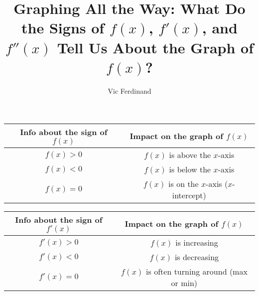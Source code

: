 \documentclass{ximera}
\author{Vic Ferdinand}
\title{Graphing All the Way: What Do the Signs of $f(x)$, $f'(x)$, and $f''(x)$ Tell Us About the Graph of $f(x)$?}
\begin{document}
\begin{abstract}
\end{abstract}
\maketitle

\begin{exploration}
\begin{center}
    \begin{tabular}{|c|c|} \hline
        Info about the sign of $f(x)$ & Impact on the graph of $f(x)$  \\ \hline
        $f(x) > 0$ & $f(x)$ is above the $x$-axis \\ \hline
        $f(x) < 0$ & $f(x)$ is below the $x$-axis \\ \hline
        $f(x) = 0$ & $f(x)$ is on the $x$-axis ($x$-intercept) \\ \hline
    \end{tabular}
\end{center}
\end{exploration}

\begin{exploration}
\begin{center}
    \begin{tabular}{|c|c|} \hline
        Info about the sign of $f'(x)$ & Impact on the graph of $f(x)$  \\ \hline
        $f'(x) > 0$ & $f(x)$ is increasing \\ \hline
        $f'(x) < 0$ & $f(x)$ is decreasing \\ \hline
        $f'(x) = 0$ & $f(x)$ is often turning around (max or min) \\ \hline
    \end{tabular}
\end{center}
\end{exploration}
\end{document}
